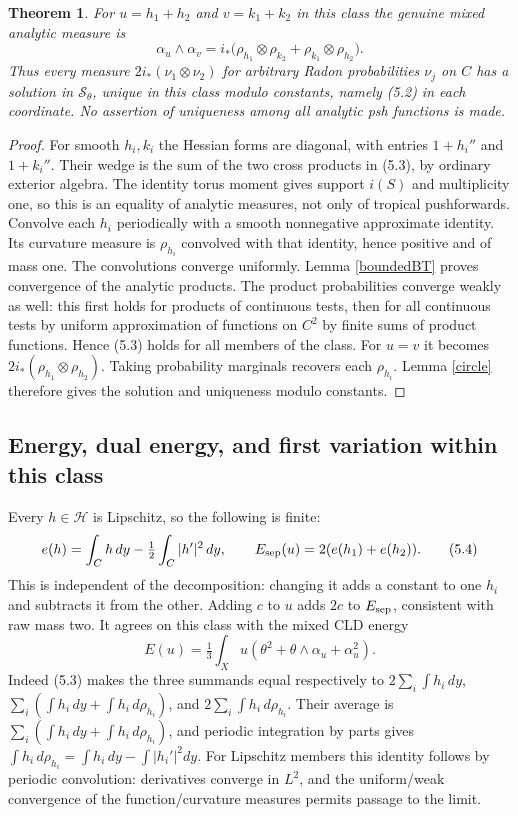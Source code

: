 \documentclass[11pt]{article}
\newtheorem{theorem}{Theorem}
\theoremstyle{definition}\newtheorem{definition}[theorem]{Definition}
\begin{document}
\begin{theorem}\label{separable}
For $u=h_1+h_2$ and $v=k_1+k_2$ in this class the genuine mixed analytic
measure is
\[
 \alpha_u\wedge\alpha_v
  =i_*\big(\rho_{h_1}\otimes\rho_{k_2}
                   +\rho_{k_1}\otimes\rho_{h_2}\big).     \tag{5.3}
\]
Thus every measure $2i_*(\nu_1\otimes\nu_2)$ for arbitrary Radon
probabilities $\nu_j$ on $C$ has a solution in $\mathcal S_\theta$,
unique in this class modulo constants, namely (5.2) in each coordinate.
No assertion of uniqueness among all analytic psh functions is made.
\end{theorem}
\begin{proof}
For smooth $h_i,k_i$ the Hessian forms are diagonal, with entries
$1+h_i''$ and $1+k_i''$. Their wedge is the sum of the two cross
products in (5.3), by ordinary exterior algebra. The identity torus
moment gives support $i(S)$ and multiplicity one, so this is an equality
of analytic measures, not only of tropical pushforwards.
Convolve each $h_i$ periodically with a smooth nonnegative approximate
identity. Its curvature measure is $\rho_{h_i}$ convolved with that
identity, hence positive and of mass one. The convolutions converge
uniformly. Lemma \ref{boundedBT} proves convergence of the analytic
products. The product probabilities converge weakly as well: this first
holds for products of continuous tests, then for all continuous tests
by uniform approximation of functions on $C^2$ by finite sums of
product functions. Hence (5.3) holds for all members of the class.
For $u=v$ it becomes $2i_*(\rho_{h_1}\otimes\rho_{h_2})$.
Taking probability marginals recovers each $\rho_{h_i}$. Lemma
\ref{circle} therefore gives the solution and uniqueness modulo constants.
\end{proof}

\subsection{Energy, dual energy, and first variation within this class}
Every $h\in\mathcal H$ is Lipschitz, so the following is finite:
\[
 e(h)=\int_C h\,dy-\tfrac12\int_C|h'|^2\,dy,
 \qquad E_{\rm sep}(u)=2(e(h_1)+e(h_2)).                 \tag{5.4}
\]
This is independent of the decomposition: changing it adds a constant to
one $h_i$ and subtracts it from the other. Adding $c$ to $u$ adds $2c$
to $E_{\rm sep}$, consistent with raw mass two.
It agrees on this class with the mixed CLD energy
\[
 E(u)=\tfrac13\int_Xu(\theta^2+\theta\wedge\alpha_u+\alpha_u^2).
                                                               \tag{5.5}
\]
Indeed (5.3) makes the three summands equal respectively to
$2\sum_i\int h_i\,dy$, $\sum_i(\int h_i\,dy+\int h_i\,d\rho_{h_i})$,
and $2\sum_i\int h_i\,d\rho_{h_i}$. Their average is
$\sum_i(\int h_i\,dy+\int h_i\,d\rho_{h_i})$, and periodic integration
by parts gives
$\int h_i\,d\rho_{h_i}=\int h_i\,dy-\int|h_i'|^2dy$.
For Lipschitz members this identity follows by periodic convolution:
derivatives converge in $L^2$, and the uniform/weak convergence of the
function/curvature measures permits passage to the limit.
\end{document}
